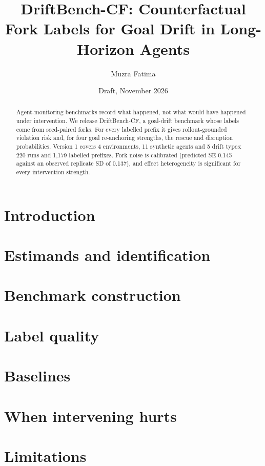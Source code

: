 \documentclass[11pt]{article}
\title{DriftBench-CF: Counterfactual Fork Labels for Goal Drift in Long-Horizon Agents}
\author{Muzra Fatima}
\date{Draft, November 2026}
\begin{document}
\maketitle

\begin{abstract}
Agent-monitoring benchmarks record what happened, not what would have happened under intervention. We
release DriftBench-CF, a goal-drift benchmark whose labels come from seed-paired forks. For every
labelled prefix it gives rollout-grounded violation risk and, for four goal re-anchoring strengths, the
rescue and disruption probabilities. Version 1 covers 4 environments, 11 synthetic agents and 5 drift
types: 220 runs and 1,179 labelled prefixes. Fork noise is calibrated (predicted SE 0.145 against an
observed replicate SD of 0.137), and effect heterogeneity is significant for every intervention strength.
\end{abstract}

\section{Introduction}
\section{Estimands and identification}
\section{Benchmark construction}
\section{Label quality}
\section{Baselines}
\section{When intervening hurts}
\section{Limitations}
\end{document}

